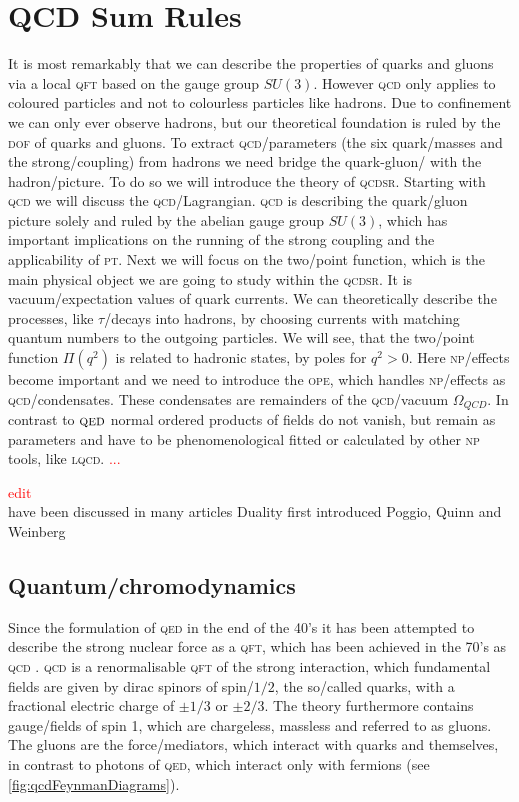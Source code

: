\documentclass[../../index.tex]{subfiles}
\begin{document}
\chapter{QCD Sum Rules}
\label{ch:theoreticalBackground}
It is most remarkably that we can describe the properties of quarks and gluons
via a local \textsc{qft} based on the gauge group $SU(3)$. However \textsc{qcd}
only applies to coloured particles and not to colourless particles like hadrons.
Due to confinement we can only ever observe hadrons, but our theoretical
foundation is ruled by the \textsc{dof} of quarks and gluons. To extract
\textsc{qcd}\-/parameters (the six quark\-/masses and the strong\-/coupling)
from hadrons we need bridge the quark-gluon\-/ with the hadron\-/picture. To do so we will introduce the
theory of \textsc{qcdsr}. Starting with \textsc{qcd} we will discuss the
\textsc{qcd}\-/Lagrangian. \textsc{qcd} is describing the quark\-/gluon picture
solely and ruled by the abelian gauge group $SU(3)$, which has important
implications on the running of the strong coupling and the applicability of
\textsc{pt}. Next we will focus on the two\-/point function, which is the main
physical object we are going to study within the \textsc{qcdsr}. It is
vacuum\-/expectation values of quark currents. We can theoretically describe the
processes, like $\tau$\-/decays into hadrons, by choosing currents with
matching quantum numbers to the outgoing particles. We will see, that the
two\-/point function $\Pi(q^2)$ is related to hadronic states, by poles for $q^2
> 0$. Here \textsc{np}\-/effects become important and we need to introduce the
\textsc{ope}, which handles \textsc{np}\-/effects as \textsc{qcd}\-/condensates. These
condensates are remainders of the \textsc{qcd}\-/vacuum $\Omega_{QCD}$. In
contrast to $\textsc{qed}$ normal ordered products of fields do not vanish, but
remain as parameters and have to be phenomenological fitted or calculated by other
\textsc{np} tools, like \textsc{lqcd}.  \textcolor{red}{...}

\textcolor{red}{edit} \\
have been discussed in many articles
\cite{Narison1989,Rafael1997,Colangelo2000,Dominguez2013} Duality first
introduced Poggio, Quinn and Weinberg \cite{Poggio1975}

\section{Quantum\-/chromodynamics}
\label{sec:quantumchromodynamics}
Since the formulation of \textsc{qed} in the end of the 40's it has been
attempted to describe the strong nuclear force as a \textsc{qft}, which has been
achieved in the 70's as \textsc{qcd}
\cite{GellMann1972,Fritzsch1973,Gross1973,Politzer1973,Weinberg1973}.
\textsc{qcd} is a renormalisable \textsc{qft} of the strong interaction, which
fundamental fields are given by dirac spinors of spin\-/$1/2$, the so\-/called
quarks, with a fractional electric charge of $\pm 1/3$ or $\pm 2/3$. The theory
furthermore contains gauge\-/fields of spin 1, which are chargeless, massless
and referred to as gluons. The gluons are the force\-/mediators, which interact
with quarks and themselves, in contrast to photons of \textsc{qed}, which
interact only with fermions (see \cref{fig:qcdFeynmanDiagrams}).
\end{document}
